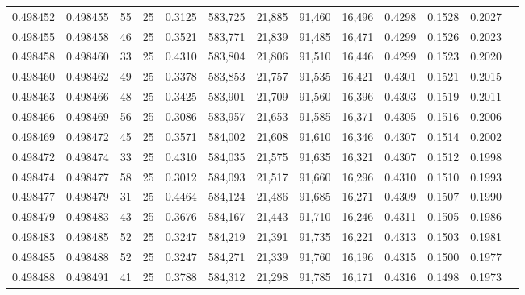 \begin{tabular}{rrrrrrrrrrrrr}
0.498452 & 0.498455 &    55 &  25 &                                     0.3125 & 583,725 &  21,885 &  91,460 &  16,496 & 0.4298 & 0.1528 & 0.2027 \\
0.498455 & 0.498458 &    46 &  25 &                                     0.3521 & 583,771 &  21,839 &  91,485 &  16,471 & 0.4299 & 0.1526 & 0.2023 \\
0.498458 & 0.498460 &    33 &  25 &                                     0.4310 & 583,804 &  21,806 &  91,510 &  16,446 & 0.4299 & 0.1523 & 0.2020 \\
0.498460 & 0.498462 &    49 &  25 &                                     0.3378 & 583,853 &  21,757 &  91,535 &  16,421 & 0.4301 & 0.1521 & 0.2015 \\
0.498463 & 0.498466 &    48 &  25 &                                     0.3425 & 583,901 &  21,709 &  91,560 &  16,396 & 0.4303 & 0.1519 & 0.2011 \\
0.498466 & 0.498469 &    56 &  25 &                                     0.3086 & 583,957 &  21,653 &  91,585 &  16,371 & 0.4305 & 0.1516 & 0.2006 \\
0.498469 & 0.498472 &    45 &  25 &                                     0.3571 & 584,002 &  21,608 &  91,610 &  16,346 & 0.4307 & 0.1514 & 0.2002 \\
0.498472 & 0.498474 &    33 &  25 &                                     0.4310 & 584,035 &  21,575 &  91,635 &  16,321 & 0.4307 & 0.1512 & 0.1998 \\
0.498474 & 0.498477 &    58 &  25 &                                     0.3012 & 584,093 &  21,517 &  91,660 &  16,296 & 0.4310 & 0.1510 & 0.1993 \\
0.498477 & 0.498479 &    31 &  25 &                                     0.4464 & 584,124 &  21,486 &  91,685 &  16,271 & 0.4309 & 0.1507 & 0.1990 \\
0.498479 & 0.498483 &    43 &  25 &                                     0.3676 & 584,167 &  21,443 &  91,710 &  16,246 & 0.4311 & 0.1505 & 0.1986 \\
0.498483 & 0.498485 &    52 &  25 &                                     0.3247 & 584,219 &  21,391 &  91,735 &  16,221 & 0.4313 & 0.1503 & 0.1981 \\
0.498485 & 0.498488 &    52 &  25 &                                     0.3247 & 584,271 &  21,339 &  91,760 &  16,196 & 0.4315 & 0.1500 & 0.1977 \\
0.498488 & 0.498491 &    41 &  25 &                                     0.3788 & 584,312 &  21,298 &  91,785 &  16,171 & 0.4316 & 0.1498 & 0.1973 \\

\end{tabular}
